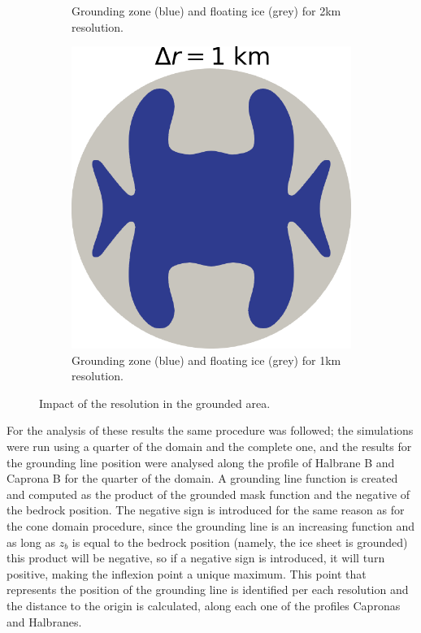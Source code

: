 \documentclass{article}
\begin{document}
\begin{figure}[!h]
\begin{subfigure}{0.25\textwidth}
		\caption{Grounding zone (blue) and floating ice (grey) for 2km resolution.}
		\label{fig:5}
	\end{subfigure}\hfil %
	\begin{subfigure}{0.25\textwidth}
		\includegraphics[width=\linewidth]{../fig/Grounded_zone_1km.png}
		\caption{Grounding zone (blue) and floating ice (grey) for 1km resolution.}
		\label{fig:6}
	\end{subfigure}
	\caption{Impact of the resolution in the grounded area.}
	\label{Thule_resolutions}
\end{figure}

For the analysis of these results the same procedure was followed; the simulations were run using a quarter of the domain and the complete one, and the results for the grounding line position were analysed along the profile of Halbrane B and Caprona B for the quarter of the domain. A grounding line function is created and computed as the product of the grounded mask function and the negative of the bedrock position. The negative sign is introduced for the same reason as for the cone domain procedure, since the grounding line is an increasing function and as long as $z_b$ is equal to the bedrock position (namely, the ice sheet is grounded) this product will be negative, so if a negative sign is introduced, it will turn positive, making the inflexion point a unique maximum. This point that represents the position of the grounding line is identified per each resolution and the distance to the origin is calculated, along each one of the profiles Capronas and Halbranes.
\end{document}
